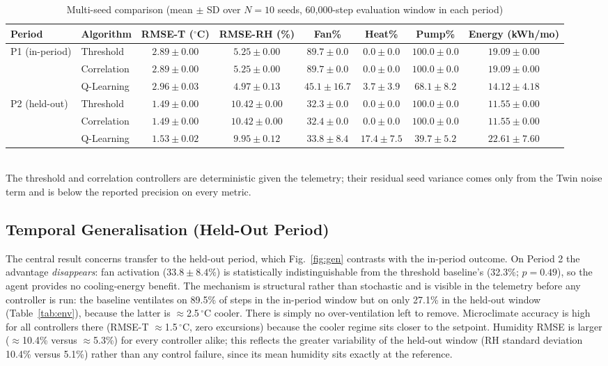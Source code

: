 \documentclass[conference]{IEEEtran}
\begin{document}
\begin{table}[t]
\caption{Multi-seed comparison (mean $\pm$ SD over $N=10$ seeds,
60{,}000-step evaluation window in each period)}
\label{tab:multiseed}
\centering
\begin{tabular}{llcccccc}
\toprule
Period & Algorithm & RMSE-T ($^{\circ}$C) & RMSE-RH (\%) & Fan\% & Heat\% & Pump\% & Energy (kWh/mo) \\
\midrule
\multirow{3}{*}{P1 (in-period)}
 & Threshold    & $2.89\pm0.00$ & $5.25\pm0.00$ & $89.7\pm0.0$ & $0.0\pm0.0$ & $100.0\pm0.0$ & $19.09\pm0.00$ \\
 & Correlation  & $2.89\pm0.00$ & $5.25\pm0.00$ & $89.7\pm0.0$ & $0.0\pm0.0$ & $100.0\pm0.0$ & $19.09\pm0.00$ \\
 & Q-Learning   & $2.96\pm0.03$ & $4.97\pm0.13$ & $45.1\pm16.7$ & $3.7\pm3.9$ & $68.1\pm8.2$ & $14.12\pm4.18$ \\
\midrule
\multirow{3}{*}{P2 (held-out)}
 & Threshold    & $1.49\pm0.00$ & $10.42\pm0.00$ & $32.3\pm0.0$ & $0.0\pm0.0$ & $100.0\pm0.0$ & $11.55\pm0.00$ \\
 & Correlation  & $1.49\pm0.00$ & $10.42\pm0.00$ & $32.4\pm0.0$ & $0.0\pm0.0$ & $100.0\pm0.0$ & $11.55\pm0.00$ \\
 & Q-Learning   & $1.53\pm0.02$ & $9.95\pm0.12$ & $33.8\pm8.4$ & $17.4\pm7.5$ & $39.7\pm5.2$ & $22.61\pm7.60$ \\
\bottomrule
\end{tabular}
\\[2pt]
\footnotesize The threshold and correlation controllers are deterministic given
the telemetry; their residual seed variance comes only from the Twin noise term
and is below the reported precision on every metric.
\end{table}

\subsection{Temporal Generalisation (Held-Out Period)}
\label{sec:generalization}
The central result concerns transfer to the held-out period, which
Fig.~\ref{fig:gen} contrasts with the in-period outcome. On Period 2 the
advantage \emph{disappears}: fan activation ($33.8\pm8.4\%$) is statistically
indistinguishable from the threshold baseline's (32.3\%; $p=0.49$), so the agent
provides no cooling-energy benefit. The mechanism is structural rather than
stochastic and is visible in the telemetry before any controller is run: the
baseline ventilates on 89.5\% of steps in the in-period window but on only 27.1\%
in the held-out window (Table~\ref{tab:env}), because the latter is
$\approx$2.5\,$^{\circ}$C cooler. There is simply no over-ventilation left to
remove. Microclimate accuracy is high for all controllers there (RMSE-T
$\approx$1.5\,$^{\circ}$C, zero excursions) because the cooler regime sits closer
to the setpoint. Humidity RMSE is larger ($\approx$10.4\% versus $\approx$5.3\%)
for every controller alike; this reflects the greater variability of the held-out
window (RH standard deviation 10.4\% versus 5.1\%) rather than any control
failure, since its mean humidity sits exactly at the reference.
\end{document}
